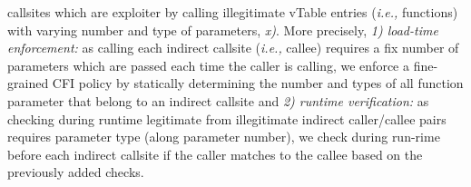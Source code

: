 callsites which are exploiter by calling illegitimate vTable entries (\textit{i.e.,} functions)
with varying number and type of parameters, \textit{x)}.
More precisely, 
\textit{1) load-time enforcement:} as calling each indirect callsite (\textit{i.e.,} callee) requires 
a fix number of parameters which are passed each time the caller is calling, we
enforce a fine-grained CFI policy by statically determining the number and types of all function parameter
that belong to an indirect callsite and
\textit{2) runtime verification:} as checking during runtime legitimate from
illegitimate indirect caller/callee pairs requires parameter type (along parameter number),
we check during run-rime before each indirect callsite if the caller matches to the callee 
based on the previously added checks.

% 

